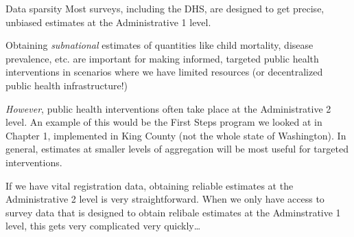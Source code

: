 \documentclass[10pt,t]{beamer}
\begin{document}
\begin{frame}{Data sparsity}
Most surveys, including the DHS, are designed to get precise, unbiased estimates at the Administrative 1 level. 

\vspace{0.3cm}

Obtaining \textit{subnational} estimates of quantities like child mortality, disease prevalence, etc. are important for making informed, targeted public health interventions in scenarios where we have limited resources (or decentralized public health infrastructure!)

\vspace{0.3cm}

\textit{However}, public health interventions often take place at the Administrative 2 level. An example of this would be the First Steps program we looked at in Chapter 1, implemented in King County (not the whole state of Washington). In general, estimates at smaller levels of aggregation will be most useful for targeted interventions. 

\vspace{0.3cm}

\pause If we have vital registration data, obtaining reliable estimates at the Administrative 2 level is very straightforward. When we only have access to survey data that is designed to obtain relibale estimates at the Adminstrative 1 level, this gets very complicated very quickly\dots
\end{frame}
\end{document}
